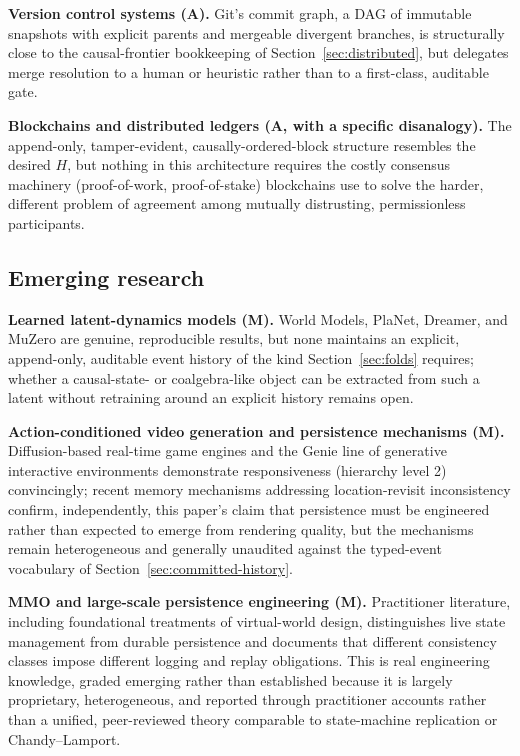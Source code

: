 \documentclass[11pt]{article}
\begin{document}
\textbf{Version control systems (A).} Git's commit graph, a DAG of immutable snapshots with explicit parents and mergeable divergent branches, is structurally close to the causal-frontier bookkeeping of Section~\ref{sec:distributed}, but delegates merge resolution to a human or heuristic rather than to a first-class, auditable gate.

\textbf{Blockchains and distributed ledgers (A, with a specific disanalogy).} The append-only, tamper-evident, causally-ordered-block structure resembles the desired $H$, but nothing in this architecture requires the costly consensus machinery (proof-of-work, proof-of-stake) blockchains use to solve the harder, different problem of agreement among mutually distrusting, permissionless participants.

\subsection{Emerging research}
\label{sec:emerging}

\textbf{Learned latent-dynamics models (M).} World Models, PlaNet, Dreamer, and MuZero are genuine, reproducible results, but none maintains an explicit, append-only, auditable event history of the kind Section~\ref{sec:folds} requires; whether a causal-state- or coalgebra-like object can be extracted from such a latent without retraining around an explicit history remains open.

\textbf{Action-conditioned video generation and persistence mechanisms (M).} Diffusion-based real-time game engines and the Genie line of generative interactive environments demonstrate responsiveness (hierarchy level 2) convincingly; recent memory mechanisms addressing location-revisit inconsistency confirm, independently, this paper's claim that persistence must be engineered rather than expected to emerge from rendering quality, but the mechanisms remain heterogeneous and generally unaudited against the typed-event vocabulary of Section~\ref{sec:committed-history}.

\textbf{MMO and large-scale persistence engineering (M).} Practitioner literature, including foundational treatments of virtual-world design, distinguishes live state management from durable persistence and documents that different consistency classes impose different logging and replay obligations. This is real engineering knowledge, graded emerging rather than established because it is largely proprietary, heterogeneous, and reported through practitioner accounts rather than a unified, peer-reviewed theory comparable to state-machine replication or Chandy--Lamport.
\end{document}
